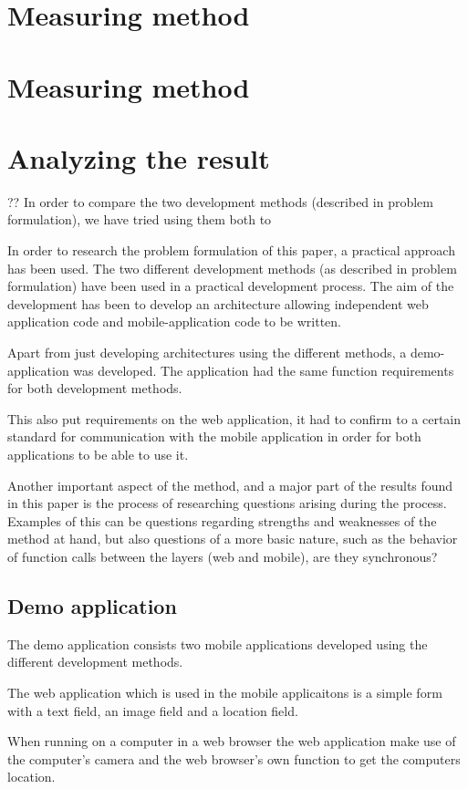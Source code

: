 \section{Measuring method}
\section{Measuring method}
\section{Analyzing the result}
??
In order to compare the two development methods (described in problem formulation), we have tried using them both to 

In order to research the problem formulation of this paper, a practical approach has been used. The two different development methods (as described in problem formulation) have been used in a practical development process. The aim of the development has been to develop an architecture allowing independent web application code and mobile-application code to be written.

Apart from just developing architectures using the different methods, a demo-application was developed. The application had the same function requirements for both development methods.

This also put requirements on the web application, it had to confirm to a certain standard for communication with the mobile application in order for both applications to be able to use it. 

Another important aspect of the method, and a major part of the results found in this paper is the process of researching questions arising during the process. Examples of this can be questions regarding strengths and weaknesses of the method at hand, but also questions of a more basic nature, such as the behavior of function calls between the layers (web and mobile), are they synchronous?

\subsection{Demo application}
The demo application consists two mobile applications developed using the different development methods. 

The web application which is used in the mobile applicaitons is a simple form with a text field, an image field and a location field.

When running on a computer in a web browser the web application make use of the computer's camera and the web browser's own function to get the computers location.

